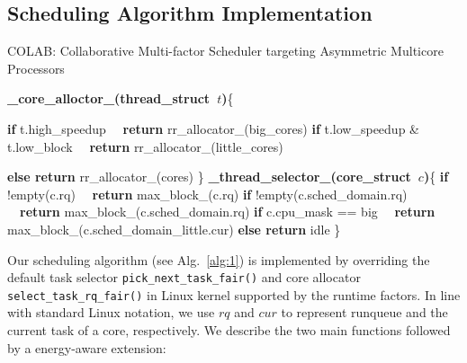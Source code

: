 \subsection{Scheduling Algorithm Implementation}
\begin{algorithm}
\caption{COLAB: Collaborative Multi-factor Scheduler targeting Asymmetric Multicore Processors}
\label{alg:1}
\begin{algorithmic}[]
\STATE \textbf{\_core\_alloctor\_(thread\_struct\ $t$)}\{

\STATE \textbf{if} t.high\_speedup
\STATE \ \ \textbf{return} rr\_allocator\_(big\_cores)
\STATE \textbf{if} {t.low\_speedup \& t.low\_block}
\STATE \ \ \textbf{return} rr\_allocator\_(little\_cores)

\STATE \textbf{else return} rr\_allocator\_(cores) \}
\STATE
\STATE \textbf{\_thread\_selector\_(core\_struct\ $c$)}\{
\STATE \textbf{if}  !empty(c.rq)
\STATE \ \ \textbf{return} max\_block\_(c.rq)
\STATE \textbf{if} !empty(c.sched\_domain.rq)
\STATE \ \ \textbf{return} max\_block\_(c.sched\_domain.rq)
\STATE \textbf{if} c.cpu\_mask == big
\STATE \ \ \textbf{return}  max\_block\_(c.sched\_domain\_little.cur)
\STATE \textbf{else return} idle \}
\end{algorithmic}
\end{algorithm}

\noindent
Our scheduling algorithm (see Alg.~\ref{alg:1}) is implemented by overriding the default task selector \texttt{pick\_next\_task\_fair()} and core allocator \texttt{select\_task\_rq\_fair()} in Linux kernel supported by the runtime factors. %
In line with standard Linux notation, we use $rq$ and $cur$ to represent runqueue and the current task of a core, respectively. We describe the two main functions followed by a energy-aware extension:

